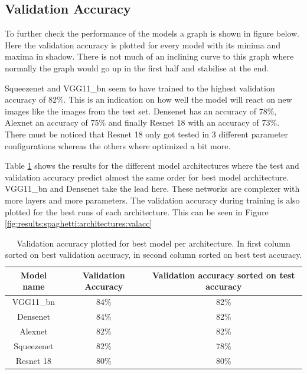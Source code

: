 		\subsection{Validation Accuracy}
To further check the performance of the models a graph is shown in figure below. Here the validation accuracy is plotted for every model with its minima and maxima in shadow. There is not much of an inclining curve to this graph where normally the graph would go up in the first half and stabilise at the end.

Squeezenet and VGG11\_bn  seem to have trained to the highest validation accuracy of 82\%. This is an indication on how well the model will react on new images like the images from the test set. Densenet has an accuracy of 78\%, Alexnet an accuracy of 75\% and finally Resnet 18 with an accuracy of 73\%. There must be noticed that Resnet 18 only got tested in 3 different parameter configurations whereas the others where optimized a bit more.
	
	
	Table \ref{tab:results:spaghetti:valacc} shows the results for the different model architectures where the test and validation accuracy predict almost the same order for best model architecture. VGG11\_bn and Densenet take the lead here. These networks are complexer with more layers and more parameters. The validation accuracy during training is also plotted for the best runs of each architecture. This can be seen in Figure \ref{fig:results:spaghetti:architectures:valacc}
	\begin{table}[h!]
			\begin{tabular}{ c | c c }
			Model name		& Validation Accuracy 	& Validation accuracy sorted on test accuracy	\\ \hline
			VGG11\_bn 			& 84\%						& 82\%					\\
		 	Densenet 				& 84\%						& 82\% 				\\ 
		 	Alexnet			& 82\%							& 82\%					\\
		 	Squeezenet			& 82\%							& 78\%					\\
		 	Resnet 18 		& 80\%						& 80\%					\\
			\end{tabular}
			\caption{Validation accuracy plotted for best model per architecture. In first column sorted on best validation accuracy, in second column sorted on best test accuracy.}
			\label{tab:results:spaghetti:valacc}
		\end{table}
		
